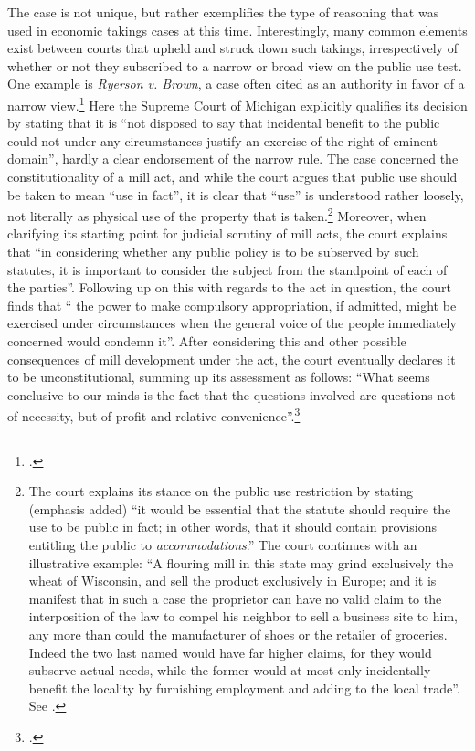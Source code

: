 \documentclass[12pt,a4paper]{book} %
\begin{document}
The case is not unique, but rather exemplifies the type of reasoning that was used in economic takings cases at this time. Interestingly, many common elements exist between courts that upheld and struck down such takings, irrespectively of whether or not they subscribed to a narrow or broad view on the public use test. One example is {\it Ryerson v. Brown}, a case often cited as an authority in favor of a narrow view.\footcite{ryerson77} Here the Supreme Court of Michigan explicitly qualifies its decision by stating that it is ``not disposed to say that incidental benefit to the public could not under any circumstances justify an exercise of the right of eminent domain'', hardly a clear endorsement of the narrow rule. The case concerned the constitutionality of a mill act, and while the court argues that public use should be taken to mean ``use in fact'', it is clear that ``use'' is understood rather loosely, not literally as physical use of the property that is taken.\footnote{The court explains its stance on the public use restriction by stating (emphasis added) ``it would be essential that the statute should require the use to be public in fact; in other words, that it should contain provisions entitling the public to {\it accommodations}.'' The court continues with an illustrative example: ``A flouring mill in this state may grind exclusively the wheat of Wisconsin, and sell the product exclusively in Europe; and it is manifest that in such a case the proprietor can have no valid claim to the interposition of the law to compel his neighbor to sell a business site to him, any more than could the manufacturer of shoes or the retailer of groceries. Indeed the two last named would have far higher claims, for they would subserve actual needs, while the former would at most only incidentally benefit the locality by furnishing employment and adding to the local trade''. See \cite[336]{ryerson77}.} Moreover, when clarifying its starting point for judicial scrutiny of mill acts, the court explains that ``in considering whether any public policy is to be subserved by such statutes, it is important to consider the subject from the standpoint of each of the parties''. Following up on this with regards to the act in question, the court finds that `` the power to make compulsory appropriation, if admitted, might be exercised under circumstances when the general voice of the people immediately concerned would condemn it''. After considering this and other possible consequences of mill development under the act, the court eventually declares it to be unconstitutional, summing up its assessment as follows: ``What seems conclusive to our minds is the fact that the questions involved are questions not of necessity, but of profit and relative convenience''.\footcite[336]{ryerson77}
\end{document}
